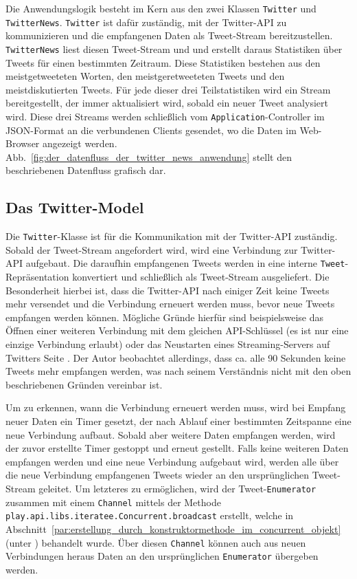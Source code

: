 Die Anwendungslogik besteht im Kern aus den zwei Klassen \lstinline|Twitter| und \lstinline|TwitterNews|.
\lstinline|Twitter| ist dafür zuständig, mit der Twitter-API zu kommunizieren und die empfangenen Daten als Tweet-Stream bereitzustellen.
\lstinline|TwitterNews| liest diesen Tweet-Stream und und erstellt daraus Statistiken über Tweets für einen bestimmten Zeitraum.
Diese Statistiken bestehen aus den meistgetweeteten Worten, den meistgeretweeteten Tweets und den meistdiskutierten Tweets.
Für jede dieser drei Teilstatistiken wird ein Stream bereitgestellt, der immer aktualisiert wird, sobald ein neuer Tweet analysiert wird.
Diese drei Streams werden schließlich vom \lstinline|Application|-Controller im JSON-Format an die verbundenen Clients gesendet, wo die Daten im Web-Browser angezeigt werden.
Abb.~\ref{fig:der_datenfluss_der_twitter_news_anwendung} stellt den beschriebenen Datenfluss grafisch dar.


\subsection{Das Twitter-Model} %
\label{sub:die_twitter_klasse}

Die \lstinline|Twitter|-Klasse ist für die Kommunikation mit der Twitter-API zuständig.
Sobald der Tweet-Stream angefordert wird, wird eine Verbindung zur Twitter-API aufgebaut.
Die daraufhin empfangenen Tweets werden in eine interne \lstinline|Tweet|-Repräsentation konvertiert und schließlich als Tweet-Stream ausgeliefert.
Die Besonderheit hierbei ist, dass die Twitter-API nach einiger Zeit keine Tweets mehr versendet und die Verbindung erneuert werden muss, bevor neue Tweets empfangen werden können.
Mögliche Gründe hierfür sind beispielsweise das Öffnen einer weiteren Verbindung mit dem gleichen API-Schlüssel (es ist nur eine einzige Verbindung erlaubt) oder das Neustarten eines Streaming-Servers auf Twitters Seite \cite[vgl.][]{twitter_connecting_to_streaming_endpoint}.
Der Autor beobachtet allerdings, dass ca. alle 90 Sekunden keine Tweets mehr empfangen werden, was nach seinem Verständnis nicht mit den oben beschriebenen Gründen vereinbar ist.

Um zu erkennen, wann die Verbindung erneuert werden muss, wird bei Empfang neuer Daten ein Timer gesetzt, der nach Ablauf einer bestimmten Zeitspanne eine neue Verbindung aufbaut.
Sobald aber weitere Daten empfangen werden, wird der zuvor erstellte Timer gestoppt und erneut gestellt.
Falls keine weiteren Daten empfangen werden und eine neue Verbindung aufgebaut wird, werden alle über die neue Verbindung empfangenen Tweets wieder an den ursprünglichen Tweet-Stream geleitet.
Um letzteres zu ermöglichen, wird der Tweet-\lstinline|Enumerator| zusammen mit einem \lstinline|Channel| mittels der Methode \lstinline|play.api.libs.iteratee.Concurrent.broadcast| erstellt, welche in Abschnitt~\ref{par:erstellung_durch_konstruktormethode_im_concurrent_objekt} (unter ) behandelt wurde.
Über diesen \lstinline|Channel| können auch aus neuen Verbindungen heraus Daten an den ursprünglichen \lstinline|Enumerator| übergeben werden.

